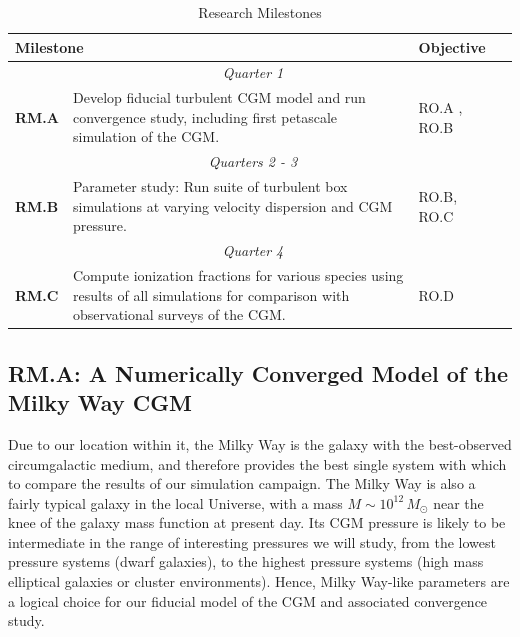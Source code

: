 \documentclass[11pt,letterpaper,english]{article}
\begin{document}
\begin{table}[h]
\caption{Research Milestones}
\label{table:RM}
\begin{tabular}{|l|p{4.7in}|p{0.9in}|l|} 
\hline
\multicolumn{2}{|l|}{\bf Milestone} & {\bf Objective} \\ \hline
\multicolumn{3}{|c|}{\it Quarter 1} \\ \hline
\textbf{RM.A} & Develop fiducial turbulent CGM model and run convergence study, including first petascale simulation of the CGM. & RO.A , RO.B \\ \hline
\multicolumn{3}{|c|}{\it Quarters 2 - 3} \\ \hline
\textbf{RM.B} & Parameter study: Run suite of turbulent box simulations at varying velocity dispersion and CGM pressure. & RO.B, RO.C\\ \hline
\multicolumn{3}{|c|}{\it Quarter 4} \\ \hline
\textbf{RM.C} & Compute ionization fractions for various species using results of all simulations for comparison with observational surveys of the CGM. & RO.D \\ \hline
\end{tabular}
\end{table}

\vspace{-.25in}
\subsection{RM.A: A Numerically Converged Model of the Milky Way CGM}
\vspace{-.2in}

Due to our location within it, the Milky Way is the galaxy with the best-observed circumgalactic medium, and therefore provides the best single system with which to compare the results of our simulation campaign. The Milky Way is also a fairly typical galaxy in the local Universe, with a mass $M \sim 10^{12}\,M_\odot$ near the knee of the galaxy mass function at present day. Its CGM pressure is likely to be intermediate in the range of interesting pressures we will study, from the lowest pressure systems (dwarf galaxies), to the highest pressure systems (high mass elliptical galaxies or cluster environments). Hence, Milky Way-like parameters are a logical choice for our fiducial model of the CGM and associated convergence study.
\end{document}
